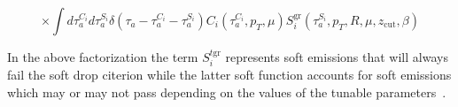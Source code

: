 \begin{equation}
\times \int d \tau_{a}^{C_{i}} d \tau_{a}^{S_{i}} \delta\left(\tau_{a}-\tau_{a}^{C_{i}}-\tau_{a}^{S_{i}}\right) C_{i}\left(\tau_{a}^{C_{i}}, p_{T}, \mu\right) S_{i}^{\operatorname{gr}}\left(\tau_{a}^{S_{i}}, p_{T}, R, \mu, z_{\mathrm{cut}}, \beta\right)
\end{equation}

In the above factorization the term $S_{i}^{t \mathrm{gr}}$ represents soft emissions that will always fail the soft drop citerion while the latter soft function accounts for soft emissions which may or may not pass depending on the values of the tunable parameters~\cite{Kang:2018vgn}.


















